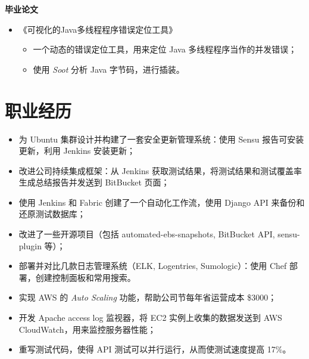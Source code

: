 \documentclass{resume}
\begin{document}
\textbf{毕业论文}
\begin{itemize}
\item 《可视化的Java多线程程序错误定位工具》
\begin{itemize}
\item 一个动态的错误定位工具，用来定位 Java 多线程程序当作的并发错误；
\item 使用 \textit{Soot} 分析 Java 字节码，进行插装。
\end{itemize}
\end{itemize}


%
%


\section{职业经历}
\begin{itemize}
\item 为 Ubuntu 集群设计并构建了一套安全更新管理系统：使用 Sensu 报告可安装更新，利用 Jenkins  安装更新；
\item 改进公司持续集成框架：从 Jenkins 获取测试结果，将测试结果和测试覆盖率生成总结报告并发送到 BitBucket 页面；
\item 使用 Jenkins 和 Fabric 创建了一个自动化工作流，使用 Django API 来备份和还原测试数据库；
\item 改进了一些开源项目（包括 automated-ebs-snapshots, BitBucket API, sensu-plugin 等）；
\item 部署并对比几款日志管理系统（ELK, Logentries, Sumologic）：使用 Chef 部署，创建控制面板和常用搜索。
\end{itemize}

\begin{itemize}
\item 实现 AWS 的 \emph{Auto Scaling} 功能，帮助公司节每年省运营成本 \$3000；
\item 开发 Apache access log 监视器，将 EC2 实例上收集的数据发送到 AWS CloudWatch，用来监控服务器性能；
\item 重写测试代码，使得 API 测试可以并行运行，从而使测试速度提高 17\%。
\end{itemize}
\end{document}
